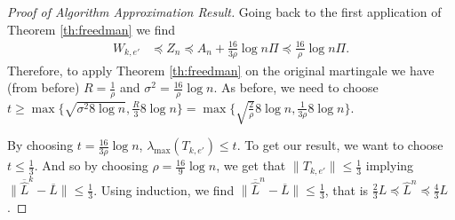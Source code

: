 \documentclass[11pt]{article}
\begin{document}
\begin{proof}[Proof of Algorithm Approximation Result]
Going back to the first application of Theorem \ref{th:freedman} we find
\begin{align*}
W_{k,e'} &\preccurlyeq Z_{n} \preccurlyeq A_{n} + \frac{16}{3\rho}\log{n}\Pi \preccurlyeq \frac{16}{\rho}\log{n}\Pi.
\end{align*}
Therefore, to apply Theorem \ref{th:freedman} on the original martingale we have (from before) $ R = \frac{1}{\rho} $ and $ \sigma^{2} = \frac{16}{\rho}\log{n} $. As before, we need to choose $ t \geq \max\{\sqrt{\sigma^{2}8\log{n}}, \frac{R}{3}8\log{n}\} = \max\{\sqrt{\frac{2}{\rho}}8\log{n}, \frac{1}{3\rho}8\log{n}\}$.

By choosing $ t = \frac{16}{3\rho}\log{n} $, $\lambda_{\text{max}}(T_{k,e'}) \leq t $. To get our result, we want to choose $ t \leq \frac{1}{3} $. And so by choosing $ \rho = \frac{16}{9}\log{n} $, we get that $ \lVert T_{k,e'} \rVert \leq \frac{1}{3} $ implying $ \lVert \overline{\widehat{L}}^{k} - \overline{L} \rVert \leq \frac{1}{3} $. Using induction, we find $ \lVert \overline{\widehat{L}}^{n} - \overline{L} \rVert \leq \frac{1}{3} $, that is $ \frac{2}{3}L \preccurlyeq \widehat{L}^{n} \preccurlyeq\frac{4}{3}L $.
\end{proof}
\end{document}
